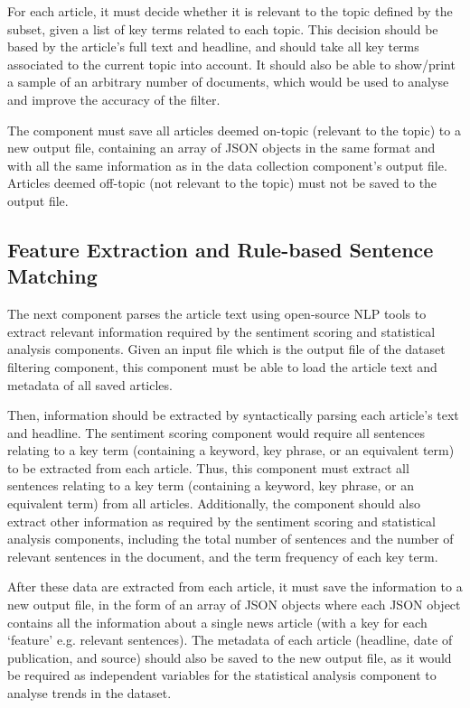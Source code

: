 \documentclass{report}
\begin{document}
For each article, it must decide whether it is relevant to the topic defined by the subset, given a list of key terms related to each topic.
This decision should be based by the article's full text and headline, and should take all key terms associated to the current topic into account.
It should also be able to show/print a sample of an arbitrary number of documents, which would be used to analyse and improve the accuracy of the filter.

The component must save all articles deemed on-topic (relevant to the topic) to a new output file, containing an array of JSON objects in the same format and with all the same information as in the data collection component's output file.
Articles deemed off-topic (not relevant to the topic) must not be saved to the output file.

\subsection{Feature Extraction and Rule-based Sentence Matching} \label{req-matching}

The next component parses the article text using open-source NLP tools to extract relevant information required by the sentiment scoring and statistical analysis components.
Given an input file which is the output file of the dataset filtering component, this component must be able to load the article text and metadata of all saved articles.

Then, information should be extracted by syntactically parsing each article's text and headline.
The sentiment scoring component would require all sentences relating to a key term (containing a keyword, key phrase, or an equivalent term) to be extracted from each article.
Thus, this component must extract all sentences relating to a key term (containing a keyword, key phrase, or an equivalent term) from all articles.
Additionally, the component should also extract other information as required by the sentiment scoring and statistical analysis components, including the total number of sentences and the number of relevant sentences in the document, and the term frequency of each key term.

After these data are extracted from each article, it must save the information to a new output file, in the form of an array of JSON objects where each JSON object contains all the information about a single news article (with a key for each `feature' e.g. relevant sentences).
The metadata of each article (headline, date of publication, and source) should also be saved to the new output file, as it would be required as independent variables for the statistical analysis component to analyse trends in the dataset.
\end{document}
